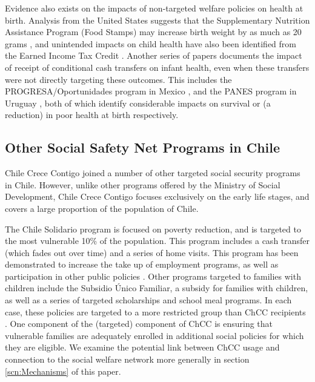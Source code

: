 \documentclass[12pt]{article}
\begin{document}
\begin{spacing}{1.4}
Evidence also exists on the impacts of non-targeted welfare policies
on health at birth.  Analysis from the United States suggests that the
Supplementary Nutrition Assistance Program (Food Stamps) may increase
birth weight by as much as 20 grams \citep{Almondetal2011}, and
unintended impacts on child health have also been identified from the
Earned Income Tax Credit \citep{Hoynesetal2015}.  Another series of
papers documents the impact of receipt of conditional cash transfers
on infant health, even when these transfers were not directly targeting
these outcomes.  This includes the PROGRESA/Oportunidades program
in Mexico \citep{Barham2011}, and the PANES program in Uruguay
\citep{Amaranteetal2016}, both of which identify considerable impacts
on survival or (a reduction) in poor health at birth respectively.



\subsection{Other Social Safety Net Programs in Chile}
Chile Crece Contigo joined a number of other targeted social
security programs in Chile.  However, unlike other programs
offered by the Ministry of Social Development, Chile Crece
Contigo focuses exclusively on the early life stages, and
covers a large proportion of the population of Chile.

The Chile Solidario program is focused on poverty reduction, and
is targeted to the most vulnerable 10\% of the population.  This
program includes a cash transfer (which fades out over time) and
a series of home visits.  This program has been demonstrated to
increase the take up of employment programs, as well as participation
in other public policies \citep{Carneiroetal2014}.  Other
programs targeted to families with children include the Subsidio
\'Unico Familiar, a subsidy for families with children, as well
as a series of targeted scholarships and school meal programs.
In each case, these policies are targeted to a more restricted
group than ChCC recipients \citep{Herreraetal2010}.  One
component of the (targeted) component of ChCC is ensuring that
vulnerable families are adequately enrolled in additional
social policies for which they are eligible.  We examine the
potential link between ChCC usage and connection to the social
welfare network more generally in section \ref{scn:Mechanisms} of
this paper.


\end{spacing}
\end{document}
